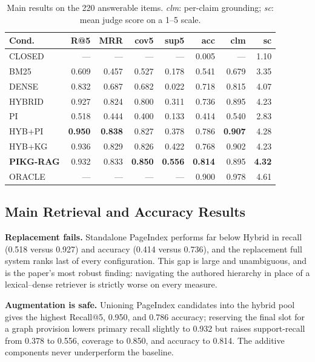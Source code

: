 \documentclass[conference]{IEEEtran}
\begin{document}
\begin{table}[t]
\caption{Main results on the 220 answerable items. \textit{clm}: per-claim grounding;
\textit{sc}: mean judge score on a 1--5 scale.}
\label{tab:main}
\centering
\footnotesize
\setlength{\tabcolsep}{2.2pt}
\begin{tabular}{@{}lrrrrrrr@{}}
\hline
\textbf{Cond.} & \textbf{R@5} & \textbf{MRR} & \textbf{cov5} & \textbf{sup5} & \textbf{acc} &
\textbf{clm} & \textbf{sc} \\
\hline
CLOSED & --- & --- & --- & --- & 0.005 & --- & 1.10 \\
BM25 & 0.609 & 0.457 & 0.527 & 0.178 & 0.541 & 0.679 & 3.35 \\
DENSE & 0.832 & 0.687 & 0.682 & 0.022 & 0.718 & 0.815 & 4.07 \\
HYBRID & 0.927 & 0.824 & 0.800 & 0.311 & 0.736 & 0.895 & 4.23 \\
PI & 0.518 & 0.444 & 0.400 & 0.133 & 0.414 & 0.540 & 2.83 \\
HYB+PI & \textbf{0.950} & \textbf{0.838} & 0.827 & 0.378 & 0.786 & \textbf{0.907} & 4.28 \\
HYB+KG & 0.936 & 0.829 & 0.826 & 0.422 & 0.768 & 0.902 & 4.23 \\
\textbf{PIKG-RAG} & 0.932 & 0.833 & \textbf{0.850} & \textbf{0.556} & \textbf{0.814} & 0.895 &
\textbf{4.32} \\
ORACLE & --- & --- & --- & --- & 0.900 & 0.978 & 4.61 \\
\hline
\end{tabular}
\end{table}

\subsection{Main Retrieval and Accuracy Results}

\textbf{Replacement fails.} Standalone PageIndex performs far below Hybrid in recall (0.518 versus
0.927) and accuracy (0.414 versus 0.736), and the replacement full system ranks last of every
configuration. This gap is large and unambiguous, and is the paper's most robust finding: navigating
the authored hierarchy in place of a lexical--dense retriever is strictly worse on every measure.

\textbf{Augmentation is safe.} Unioning PageIndex candidates into the hybrid pool gives the highest
Recall@5, 0.950, and 0.786 accuracy; reserving the final slot for a graph provision lowers primary
recall slightly to 0.932 but raises support-recall from 0.378 to 0.556, coverage to 0.850, and
accuracy to 0.814. The additive components never underperform the baseline.
\end{document}
